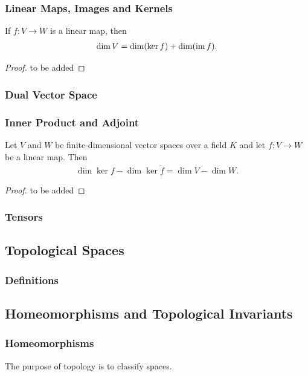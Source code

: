 \documentclass[10pt]{article}
\begin{document}
\subsubsection{Linear Maps, Images and Kernels}
\begin{theorem}
    If $f:V\to W$ is a linear map, then
    \begin{align}
        \dim{V}=\dim(\ker{f})+\dim(\operatorname{im} f).
    \end{align}
\end{theorem}
\begin{proof}
    to be added
\end{proof}

\subsubsection{Dual Vector Space}

\subsubsection{Inner Product and Adjoint}
\begin{theorem}
    Let $V$ and $W$ be finite-dimensional vector spaces over a field $K$ and let $f:V\to W$ be a linear map.
    Then
    \begin{align}
        \dim\ker f-\dim\ker\tilde{f}=\dim V-\dim W.
    \end{align}
\end{theorem}
\begin{proof}
    to be added
\end{proof}

\subsubsection{Tensors}

\subsection{Topological Spaces}
\subsubsection{Definitions}
\subsection{Homeomorphisms and Topological Invariants}
\subsubsection{Homeomorphisms}
\begin{intu}
    The purpose of topology is to classify spaces.
\end{intu}
\end{document}
